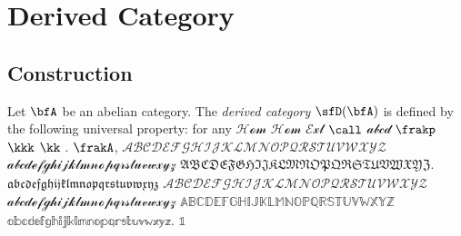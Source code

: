 \section{Derived Category}


\subsection{Construction}
    \begin{definition}\label{def:derived_category}
        Let \(\bfA\) be an abelian category. The \emph{derived category} \(\sfD(\bfA)\) is defined by the following universal property: 
        for any \(\mathcal{H\!o\!m}\) \(\mathcal{Hom}\) \(\mathcal{Ext}\) \(\call\) \(\mathscr{abcd}\) \(\frakp\) \(\kkk\) \(\kk\) .
        \(\frakA\), \(\mathscr{ABCDEFGHIJKLMNOPQRSTUVWXYZ}\) 
        \(\mathscr{abcdefghijklmnopqrstuvwxyz}\)
        \(\mathfrak{ABCDEFGHIJKLMNOPQRSTUVWXYZ}\).
        \(\mathfrak{abcdefghijklmnopqrstuvwxyz}\)
        \(\mathcal{ABCDEFGHIJKLMNOPQRSTUVWXYZ}\)
        \(\mathcal{abcdefghijklmnopqrstuvwxyz}\)
        \(\mathbb{ABCDEFGHIJKLMNOPQRSTUVWXYZ}\)
        \(\mathbb{abcdefghijklmnopqrstuvwxyz}\).
        \(\mathbb{1}\)
    \end{definition}